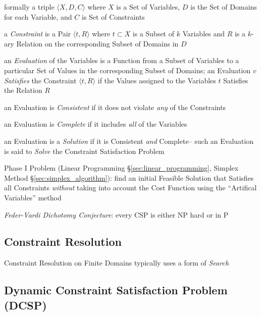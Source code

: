 formally a triple $\langle{X,D,C}\rangle$ where $X$ is a Set of Variables, $D$
is the Set of Domains for each Variable, and $C$ is Set of Constraints

a \emph{Constraint} is a Pair $\langle{t,R}\rangle$ where $t \subset X$ is a
Subset of $k$ Variables and $R$ is a $k$-ary Relation on the corresponding
Subset of Domains in $D$

an \emph{Evaluation} of the Variables is a Function from a Subset of Variables
to a particular Set of Values in the corresponding Subset of Domains; an
Evaluation $v$ \emph{Satisfies} the Constraint $\langle{t,R}\rangle$ if the
Values assigned to the Variables $t$ Satisfies the Relation $R$

an Evaluation is \emph{Consistent} if it does not violate \emph{any} of the
Constraints

an Evaluation is \emph{Complete} if it includes \emph{all} of the Variables

an Evaluation is a \emph{Solution} if it is Consistent \emph{and} Complete--
such an Evaluation is said to \emph{Solve} the Constraint Satisfaction Problem

\fist Phase I Problem (Linear Programming \S\ref{sec:linear_programming},
Simplex Method \S\ref{sec:simplex_algorithm}): find an initial Feasible
Solution that Satisfies all Constraints \emph{without} taking into account the
Cost Function using the ``Artifical Variables'' method

\emph{Feder-Vardi Dichotomy Conjecture}: every CSP is either NP hard or in P



\subsection{Constraint Resolution}\label{sec:constraint_resolution}

Constraint Resolution on Finite Domains typically uses a form of \emph{Search}



\subsection{Dynamic Constraint Satisfaction Problem (DCSP)}\label{sec:dcsp}



